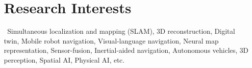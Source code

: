 \section{Research Interests}

\ Simultaneous localization and mapping (SLAM), 3D reconstruction, Digital twin, Mobile robot navigation, Visual-language navigation, Neural map representation, Sensor-fusion, Inertial-aided navigation, Autonomous vehicles, 3D perception, Spatial AI, Physical AI, etc.
